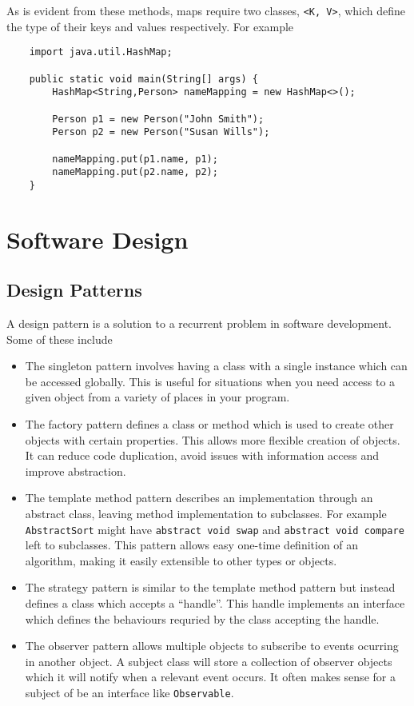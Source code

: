 \documentclass[12pt]{report}
\newcommand{\code}[1]{\lstinline{#1}}
\begin{document}
\begin{flushleft}
As is evident from these methods, maps require two classes, \code{<K, V>},
which define the type of their keys and values respectively. For example

\begin{lstlisting}
    import java.util.HashMap;

    public static void main(String[] args) {
        HashMap<String,Person> nameMapping = new HashMap<>();

        Person p1 = new Person("John Smith");
        Person p2 = new Person("Susan Wills");

        nameMapping.put(p1.name, p1);
        nameMapping.put(p2.name, p2);
    }
\end{lstlisting}

\section*{Software Design}

\subsection*{Design Patterns}

A design pattern is a solution to a recurrent problem in software development.
Some of these include

\begin{itemize}
    \item The singleton pattern involves having a class with a single instance
        which can be accessed globally. This is useful for situations when you
        need access to a given object from a variety of places in your program.
    \item The factory pattern defines a class or method which is used to create
        other objects with certain properties. This allows more flexible
        creation of objects. It can reduce code duplication, avoid issues with
        information access and improve abstraction.
    \item The template method pattern describes an implementation through an
        abstract class, leaving method implementation to subclasses. For
        example \code{AbstractSort} might have \code{abstract void swap} and
        \code{abstract void compare} left to subclasses. This pattern allows
        easy one-time definition of an algorithm, making it easily extensible
        to other types or objects.
    \item The strategy pattern is similar to the template method pattern but
        instead defines a class which accepts a ``handle''.  This handle
        implements an interface which defines the behaviours requried by the
        class accepting the handle.
    \item The observer pattern allows multiple objects to subscribe to events
        ocurring in another object. A subject class will store a collection of
        observer objects which it will notify when a relevant event occurs. It
        often makes sense for a subject of be an interface like
        \code{Observable}.
\end{itemize}


\end{flushleft}
\end{document}
